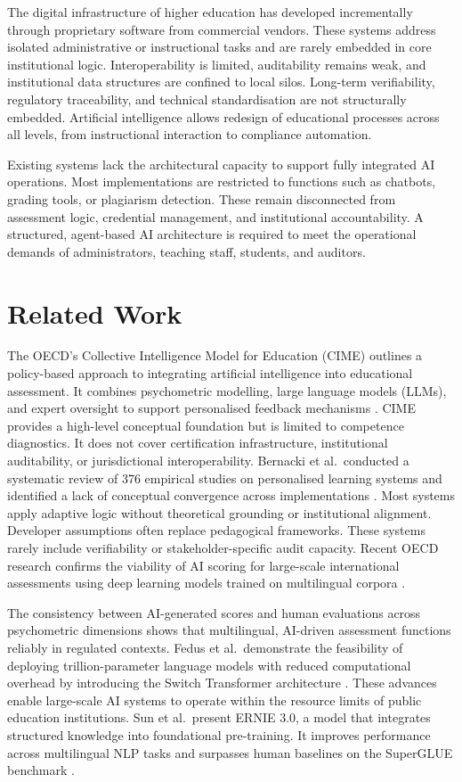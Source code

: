 \documentclass[oneside,10pt]{swissi}
\begin{document}
The digital infrastructure of higher education has developed incrementally through proprietary software from commercial vendors. These systems address isolated administrative or instructional tasks and are rarely embedded in core institutional logic. Interoperability is limited, auditability remains weak, and institutional data structures are confined to local silos. Long-term verifiability, regulatory traceability, and technical standardisation are not structurally embedded. Artificial intelligence allows redesign of educational processes across all levels, from instructional interaction to compliance automation.

Existing systems lack the architectural capacity to support fully integrated AI operations. Most implementations are restricted to functions such as chatbots, grading tools, or plagiarism detection. These remain disconnected from assessment logic, credential management, and institutional accountability. A structured, agent-based AI architecture is required to meet the operational demands of administrators, teaching staff, students, and auditors.

\section{Related Work}

The OECD’s Collective Intelligence Model for Education (CIME) outlines a policy-based approach to integrating artificial intelligence into educational assessment. It combines psychometric modelling, large language models (LLMs), and expert oversight to support personalised feedback mechanisms \cite{okubo2025cime}. CIME provides a high-level conceptual foundation but is limited to competence diagnostics. It does not cover certification infrastructure, institutional auditability, or jurisdictional interoperability. Bernacki et al.\ conducted a systematic review of 376 empirical studies on personalised learning systems and identified a lack of conceptual convergence across implementations \cite{bernacki2021systematic}. Most systems apply adaptive logic without theoretical grounding or institutional alignment. Developer assumptions often replace pedagogical frameworks. These systems rarely include verifiability or stakeholder-specific audit capacity. Recent OECD research confirms the viability of AI scoring for large-scale international assessments using deep learning models trained on multilingual corpora \cite{okubo2023aiscoring}.

The consistency between AI-generated scores and human evaluations across psychometric dimensions shows that multilingual, AI-driven assessment functions reliably in regulated contexts. Fedus et al.\ demonstrate the feasibility of deploying trillion-parameter language models with reduced computational overhead by introducing the Switch Transformer architecture \cite{fedus2022switch}. These advances enable large-scale AI systems to operate within the resource limits of public education institutions. Sun et al.\ present ERNIE 3.0, a model that integrates structured knowledge into foundational pre-training. It improves performance across multilingual NLP tasks and surpasses human baselines on the SuperGLUE benchmark \cite{sun2021ernie3}.
\end{document}

